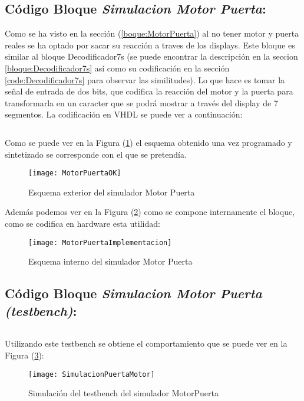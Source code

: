 \subsection{Código Bloque \textit{ Simulacion Motor Puerta}:} \label{code:MotorPuerta}
	Como se ha visto en la sección (\ref{boque:MotorPuerta}) al no tener motor y puerta reales se ha optado por sacar su reacción a traves de los displays. Este bloque es similar al bloque Decodificador7s (se puede encontrar la descripción en la seccion \ref{bloque:Decodificador7s} así como su codificación en la sección \ref{code:Decodificador7s} para observar las similitudes). Lo que hace es tomar la señal de entrada de dos bits, que codifica la reacción del motor y la puerta para transformarla en un caracter que se podrá mostrar a través del display de 7 segmentos. La codificación en VHDL se puede ver a continuación: \\ 

	\inputminted[frame=lines,fontsize=\footnotesize,linenos]{vhdl}{CodeFiles/MotorPuerta.vhd}

	Como se puede ver en la Figura (\ref{fig:MotorPuertaOK}) el esquema obtenido una vez programado y sintetizado se corresponde con el que se pretendía.
    \begin{figure}[H]
		    \centering
		    \texttt{[image: MotorPuertaOK]}
		    \caption{Esquema exterior del simulador Motor Puerta}
		    \label{fig:MotorPuertaOK}
	\end{figure}
    Además podemos ver en la Figura (\ref{fig:MotorPuertaImplementacion}) como se compone internamente el bloque, como se codifica en hardware esta utilidad:
    \begin{figure}[H]
		    \centering
		    \texttt{[image: MotorPuertaImplementacion]}
		    \caption{Esquema interno del simulador Motor Puerta}
		    \label{fig:MotorPuertaImplementacion}
	\end{figure}
\subsection{Código Bloque \textit{Simulacion Motor Puerta (testbench)}:} \label{code:MotorPuerta_tb}
	\inputminted[frame=lines,fontsize=\footnotesize,linenos]{vhdl}{CodeFiles/MotorPuerta_tb.vhd}

    Utilizando este testbench se obtiene el comportamiento que se puede ver en la Figura (\ref{fig:SimulacionMotorPuerta}):

    \begin{figure}[H]
		    \centering
		    \texttt{[image: SimulacionPuertaMotor]}
		    \caption{Simulación del testbench del simulador MotorPuerta}
		    \label{fig:SimulacionMotorPuerta}
	\end{figure}

